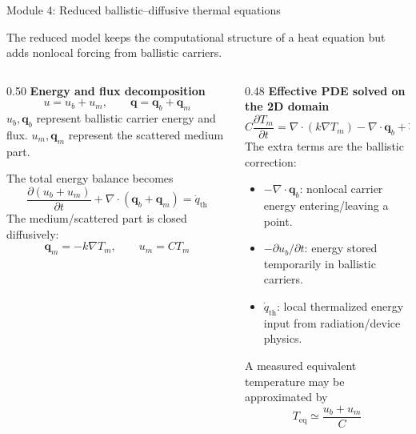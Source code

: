 \documentclass[aspectratio=169,9pt]{beamer}
\newcommand{\qvec}{\bm{q}}
\newcommand{\qth}{\dot{q}_{\mathrm{th}}}
\begin{document}
\begin{frame}{Module 4: Reduced ballistic--diffusive thermal equations}
\footnotesize
\vspace{-4mm}
\begin{bluebox}
\centering\small
The reduced model keeps the computational structure of a heat equation but adds nonlocal forcing from ballistic carriers.
\end{bluebox}

\vspace{1mm}
\begin{columns}[T,totalwidth=\textwidth]
\begin{column}{0.50\textwidth}
\textbf{Energy and flux decomposition}
\begin{equation*}
\boxed{u=u_b+u_m},\qquad
\boxed{\qvec=\qvec_b+\qvec_m}
\end{equation*}
\small
\(u_b,\qvec_b\) represent ballistic carrier energy and flux.  \(u_m,\qvec_m\) represent the scattered medium part.

\vspace{1mm}
The total energy balance becomes
\begin{equation*}
\boxed{\frac{\partial (u_b+u_m)}{\partial t}
+\nabla\cdot(\qvec_b+\qvec_m)=\qth}
\end{equation*}
\small
The medium/scattered part is closed diffusively:
\begin{equation*}
\boxed{\qvec_m=-k\nabla T_m},\qquad
\boxed{u_m=C T_m}
\end{equation*}
\end{column}

\begin{column}{0.48\textwidth}
\textbf{Effective PDE solved on the 2D domain}
\begin{equation*}
\boxed{C\frac{\partial T_m}{\partial t}
=\nabla\cdot(k\nabla T_m)
-\nabla\cdot\qvec_b
+\qth
-\frac{\partial u_b}{\partial t}}
\end{equation*}
\small
The extra terms are the ballistic correction:
\begin{itemize}\setlength\itemsep{0.25mm}
\item \(-\nabla\cdot\qvec_b\): nonlocal carrier energy entering/leaving a point.
\item \(-\partial u_b/\partial t\): energy stored temporarily in ballistic carriers.
\item \(\qth\): local thermalized energy input from radiation/device physics.
\end{itemize}

\vspace{1mm}
A measured equivalent temperature may be approximated by
\begin{equation*}
\boxed{T_{\mathrm{eq}}\simeq \frac{u_b+u_m}{C}}
\end{equation*}
\end{column}
\end{columns}


\end{frame}
\end{document}
